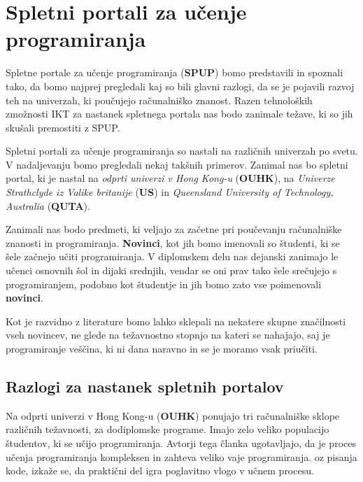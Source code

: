 \section{Spletni portali za učenje programiranja}
\label{sec:SPUP}

Spletne portale za učenje programiranja (\textbf{SPUP}) bomo
predstavili in spoznali tako, da bomo najprej pregledali kaj so bili
glavni razlogi, da se je pojavili razvoj teh na univerzah, ki
poučujejo računalniško znanost. Razen tehnoloških zmožnosti IKT za
nastanek spletnega portala nas bodo zanimale težave, ki so jih skušali
premostiti z SPUP.

Spletni portali za učenje programiranja so nastali na različnih
univerzah po svetu. V nadaljevanju bomo pregledali nekaj takšnih
primerov. Zanimal nas bo spletni portal, ki je nastal na \emph{odprti
  univerzi v Hong Kong-u} (\textbf{OUHK}), na \emph{Univerze
  Strathclyde iz Valike britanije} (\textbf{US}) in \emph{Queensland
  University of Technology, Australia} (\textbf {QUTA}). %

Zanimali nas bodo predmeti, ki veljajo za začetne pri poučevanju
računalniške znanosti in programiranja. \textbf{Novinci}, kot jih bomo
imenovali so študenti, ki se šele začnejo učiti programiranja. V
diplomskem delu nas dejanski zanimajo le učenci osnovnih šol in dijaki
srednjih, vendar se oni prav tako šele srečujejo s programiranjem,
podobno kot študentje in jih bomo zato vse poimenovali
\textbf{novinci}.

Kot je razvidno z literature bomo lahko sklepali na nekatere skupne
značilnosti vseh novincev, ne glede na težavnostno stopnjo na kateri
se nahajajo, saj je programiranje veščina, ki ni dana naravno in se je
moramo vsak priučiti.




\subsection{Razlogi za nastanek spletnih portalov}
\label{sec:razlogi_za_nastanek_SPUP}

Na odprti univerzi v Hong Kong-u (\textbf{OUHK}) ponujajo tri
računalniške sklope različnih težavnosti, za dodiplomske
programe. Imajo zelo veliko populacijo študentov, ki se učijo
programiranja. Avtorji tega članka \cite{ITaLCP_DistanceEdu}
ugotavljajo, da je proces učenja programiranja kompleksen in zahteva
veliko vaje programiranja. oz pisanja kode, izkaže se, da praktični
del igra poglavitno vlogo v učnem procesu.

